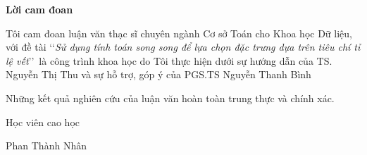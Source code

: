 \vspace*{3cm}

\begin{center}
	\LARGE{\textbf{Lời cam đoan}}
\end{center}

Tôi cam đoan luận văn thạc sĩ chuyên ngành Cơ sở Toán cho Khoa học Dữ liệu, với đề tài \lq\lq\textit{Sử dụng tính toán song song để lựa chọn đặc trưng dựa trên tiêu chí tỉ lệ vết}\rq\rq~là công trình khoa học do Tôi thực hiện dưới sự hướng dẫn của TS. Nguyễn Thị Thu và sự hỗ trợ, góp ý của PGS.TS Nguyễn Thanh Bình

Những kết quả nghiên cứu của luận văn hoàn toàn trung thực và chính xác.

\begin{flushright}
	Học viên cao học\hskip 2cm\quad
	
	\vskip 2cm
	
	{Phan Thành Nhân} \hskip 1.5cm\quad\
\end{flushright}
\thispagestyle{empty}